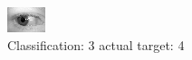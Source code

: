 \begin{figure}[h!]
\begin{center}
\includegraphics[width=0.60\columnwidth]{figures/ID759_class_3_target_4.png}
\end{center}
\caption{ Classification: 3 actual target: 4}
\label{fig:ID759_class_3_target_4}
\end{figure}
